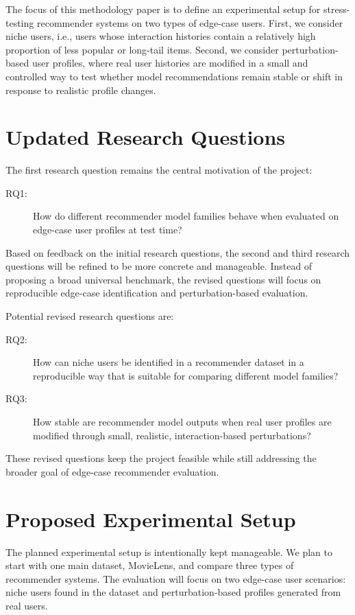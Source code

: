 \documentclass[sigconf]{acmart}
\begin{document}
The focus of this methodology paper is to define an experimental setup for stress-testing recommender systems on two types of edge-case users. First, we consider niche users, i.e., users whose interaction histories contain a relatively high proportion of less popular or long-tail items. Second, we consider perturbation-based user profiles, where real user histories are modified in a small and controlled way to test whether model recommendations remain stable or shift in response to realistic profile changes.

\section{Updated Research Questions}
The first research question remains the central motivation of the project:

\begin{description}
  \item[RQ1:] How do different recommender model families behave when evaluated on edge-case user profiles at test time?
\end{description}

Based on feedback on the initial research questions, the second and third research questions will be refined to be more concrete and manageable. Instead of proposing a broad universal benchmark, the revised questions will focus on reproducible edge-case identification and perturbation-based evaluation.

Potential revised research questions are:

\begin{description}
  \item[RQ2:] How can niche users be identified in a recommender dataset in a reproducible way that is suitable for comparing different model families?
  \item[RQ3:] How stable are recommender model outputs when real user profiles are modified through small, realistic, interaction-based perturbations?
\end{description}

These revised questions keep the project feasible while still addressing the broader goal of edge-case recommender evaluation.

\section{Proposed Experimental Setup}
The planned experimental setup is intentionally kept manageable. We plan to start with one main dataset, MovieLens, and compare three types of recommender systems. The evaluation will focus on two edge-case user scenarios: niche users found in the dataset and perturbation-based profiles generated from real users.
\end{document}
